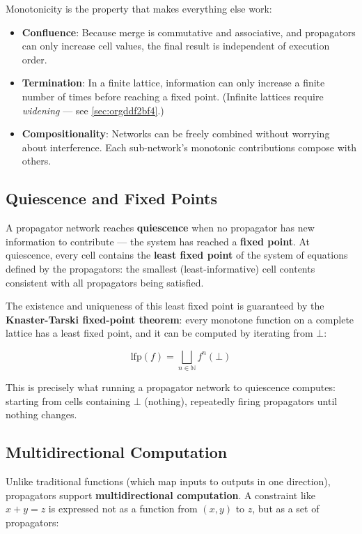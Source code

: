 \documentclass[11pt]{article}
\begin{document}
Monotonicity is the property that makes everything else work:

\begin{itemize}
\item \textbf{Confluence}: Because merge is commutative and associative, and
propagators can only increase cell values, the final result is
independent of execution order.
\item \textbf{Termination}: In a finite lattice, information can only increase a
finite number of times before reaching a fixed point. (Infinite
lattices require \emph{widening} --- see \ref{sec:orgddf2bf4}.)
\item \textbf{Compositionality}: Networks can be freely combined without worrying
about interference. Each sub-network's monotonic contributions compose
with others.
\end{itemize}
\subsection{Quiescence and Fixed Points}
\label{sec:org9157938}

A propagator network reaches \textbf{quiescence} when no propagator has new
information to contribute --- the system has reached a \textbf{fixed point}.
At quiescence, every cell contains the \textbf{least fixed point} of the system
of equations defined by the propagators: the smallest (least-informative)
cell contents consistent with all propagators being satisfied.

The existence and uniqueness of this least fixed point is guaranteed by
the \textbf{Knaster-Tarski fixed-point theorem}: every monotone function on a
complete lattice has a least fixed point, and it can be computed by
iterating from \(\bot\):

$$\text{lfp}(f) = \bigsqcup_{n \in \mathbb{N}} f^n(\bot)$$

This is precisely what running a propagator network to quiescence
computes: starting from cells containing \(\bot\) (nothing), repeatedly
firing propagators until nothing changes.
\subsection{Multidirectional Computation}
\label{sec:org2691539}

Unlike traditional functions (which map inputs to outputs in one
direction), propagators support \textbf{multidirectional computation}.
A constraint like \(x + y = z\) is expressed not as a function from
\((x, y)\) to \(z\), but as a set of propagators:
\end{document}
